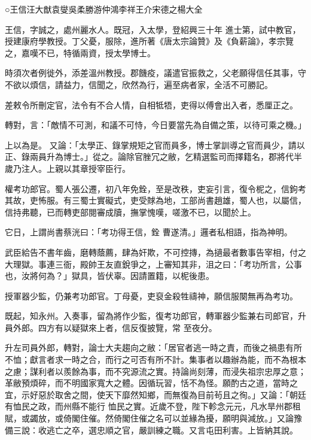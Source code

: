 
\begin{pinyinscope}

 ○王信汪大猷袁燮吳柔勝游仲鴻李祥王介宋德之楊大全



 王信，字誠之，處州麗水人。既冠，入太學，登紹興三十年
 進士第，試中教官，授建康府學教授。丁父憂，服除，進所著《唐太宗論贊》及《負薪論》，孝宗覽之，嘉嘆不已，特循兩資，授太學博士。



 時須次者例徙外，添差溫州教授。郡饑疫，議遣官振救之，父老願得信任其事，守不欲以煩信，請益力，信聞之，欣然為行，遍至病者家，全活不可勝記。



 差敕令所刪定官，法令有不合人情，自相牴牾，吏得以傅會出入者，悉厘正之。



 轉對，言：「敵情不可測，和議不可恃，今日要當先為自備之策，以待可乘之機。」



 上以為是。
 又論：「太學正、錄掌規矩之官而員多，博士掌訓導之官而員少，請以正、錄兩員升為博士。」從之。論除官脞冗之敝，乞精選監司而擇籍名，郡將代半歲乃注人。上親以其章授宰臣行。



 權考功郎官。蜀人張公遷，初八年免銓，至是改秩，吏妄引言，復令柅之，信鉤考其故，吏怖服。有三蜀士實礙式，吏受賕為地，工部尚書趙雄，蜀人也，以屬信，信持弗聽，已而轉吏部閱審成牘，撫掌愧嘆，嗟激不已，以聞於上。



 它日，上謂尚書蔡洸曰：「考功得王信，銓
 曹遂清。」邏者私相語，指為神明。



 武臣給告不書年齒，磨轉蔭薦，肆為奸欺，不可控摶，為擿最者數事告宰相，付之大理獄。事連三衙，殿帥王友直銳爭之，上審知其非，沮之曰：「考功所言，公事也，汝將何為？」獄具，皆伏辜。因請置籍，以柅後患。



 授軍器少監，仍兼考功郎官。丁母憂，吏裒金殺牲禱神，願信服闋無再為考功。



 既起，知永州。入奏事，留為將作少監，復考功郎官，轉軍器少監兼右司郎官，升員外郎。四方有以疑獄來上者，信反復披覽，常
 至夜分。



 升左司員外郎，轉對，論士大夫趨向之敝：「居官者逃一時之責，而後之禍患有所不恤；獻言者求一時之合，而行之可否有所不計。集事者以趣辦為能，而不為根本之慮；謀利者以羨餘為事，而不究源流之實。持論尚刻薄，而浸失祖宗忠厚之意；革敝預煩碎，而不明國家寬大之體。因循玩習，恬不為怪。願酌古之道，當時之宜，示好惡於取舍之間，使天下靡然知鄉，而無復為目前茍且之徇。」又論：「朝廷有恤民之政，而州縣不能行
 恤民之實。近歲不登，陛下軫念元元，凡水旱州郡租賦，或蠲放，或倚閣住催。然倚閣住催之名可以並緣為擾，願明與減放。」又論豫備三說：收逃亡之卒，選忠順之官，嚴訓練之職。又言屯田利害。上皆納其說。




\end{pinyinscope}
